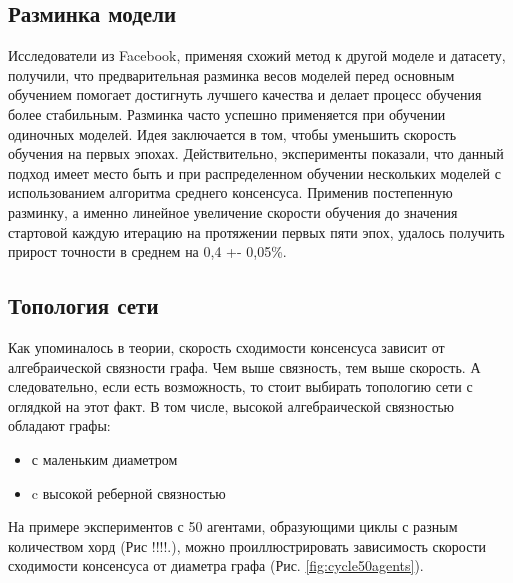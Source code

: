 \documentclass[a4paper,article,14pt]{extarticle}
\begin{document}
\subsection{Разминка модели}
Исследователи из Facebook, применяя \cite{012} схожий метод к другой моделе и датасету, получили, что предварительная разминка весов моделей перед основным обучением помогает достигнуть лучшего качества и делает процесс обучения более стабильным. Разминка часто успешно применяется при обучении одиночных моделей. Идея заключается в том, чтобы уменьшить скорость обучения на первых эпохах. Действительно, эксперименты показали, что данный подход имеет место быть и при распределенном обучении нескольких моделей с использованием алгоритма среднего консенсуса. Применив постепенную разминку, а именно линейное увеличение скорости обучения до значения стартовой каждую итерацию на протяжении первых пяти эпох, удалось получить прирост точности в среднем на 0,4 +- 0,05\%.

\subsection{Топология сети}
Как упоминалось в теории, скорость сходимости консенсуса зависит от алгебраической связности графа. Чем выше связность, тем выше скорость. А следовательно, если есть возможность, то стоит выбирать топологию сети с оглядкой на этот факт. В том числе, высокой алгебраической связностью обладают графы:
\begin{itemize}
    \item с маленьким диаметром
    \item c высокой реберной связностью
\end{itemize}

На примере экспериментов с 50 агентами, образующими циклы с разным количеством хорд (Рис !!!!.), можно проиллюстрировать зависимость скорости сходимости консенсуса от диаметра графа (Рис. \ref{fig:cycle50agents}).
\end{document}
